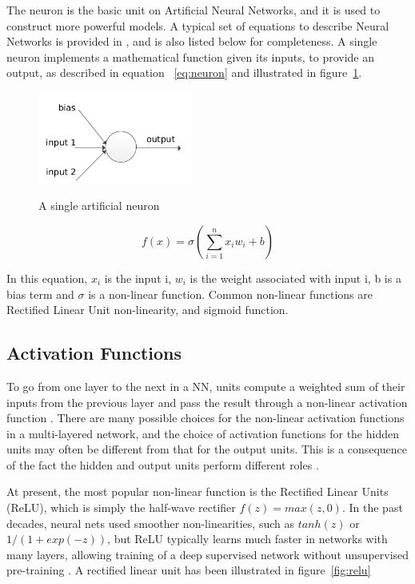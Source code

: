 The neuron is the basic unit on Artificial Neural Networks, and it is used to construct more powerful models. A typical set of equations to describe Neural Networks is provided in \cite{williams1986learning}, and is also listed below for completeness. A single neuron implements a mathematical function given its inputs, to provide an output, as described in equation ~\ref{eq:neuron} and illustrated in figure~\ref{fig:neuron}.

\begin{figure}[H]
	\centering
	{\includegraphics[width=0.45\textwidth]{images/neuron}}
	\caption{A single artificial neuron}
	\label{fig:neuron}
\end{figure}

\begin{equation}
f(x) = \sigma(\sum\limits_{i=1}^{n}x_iw_i + b) 
\label{eq:neuron}
\end{equation}

In this equation, $x_i$ is the input i, $w_i$ is the weight associated with input i, b is a bias term and $\sigma$ is a non-linear function. Common non-linear functions are Rectified Linear Unit non-linearity, and sigmoid function.

\subsection{Activation Functions}
\label{sec:actfun}
To go from one layer to the next in a NN, units compute a weighted sum of their inputs from the previous layer and pass the result through a non-linear activation function \cite{lecun2015deep}. There are many possible choices for the non-linear activation functions in a multi-layered network, and the choice of activation functions for the hidden units may often be different from that for the output units. This is a consequence of the fact the hidden and output units perform different roles \cite{bishop1995neural}. 

\indent At present, the most popular non-linear function is the Rectified Linear Units (ReLU), which is simply the half-wave rectifier $f(z) = max(z, 0)$. In the past decades, neural nets used smoother non-linearities, such as $tanh(z)$ or $1/(1+ exp(-z))$, but ReLU typically learns much faster in networks with many layers, allowing training of a deep supervised network without unsupervised pre-training \cite{lecun2015deep}. A rectified linear unit has been illustrated in figure~\ref{fig:relu}

